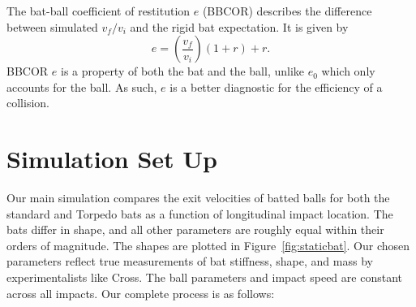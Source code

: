 \documentclass[linenumbers]{aastex7}
\begin{document}
The bat-ball coefficient of restitution $e$ (BBCOR) describes the difference between simulated $v_f/v_i$ and the rigid bat expectation. It is given by 
\begin{equation}
	e = \left(\frac{v_f}{v_i}\right)(1 + r) + r.
\end{equation}
BBCOR $e$ is a property of both the bat and the ball, unlike $e_0$ which only accounts for the ball. As such, $e$ is a better diagnostic for the efficiency of a collision.








\section{Simulation Set Up}\label{sec:simsetup}
Our main simulation compares the exit velocities of batted balls for both the standard and Torpedo bats as a function of longitudinal impact location. The bats differ in shape, and all other parameters are roughly equal within their orders of magnitude. The shapes are plotted in Figure~\ref{fig:staticbat}. Our chosen parameters reflect true measurements of bat stiffness, shape, and mass by experimentalists like Cross. The ball parameters and impact speed are constant across all impacts. Our complete process is as follows:
\end{document}
